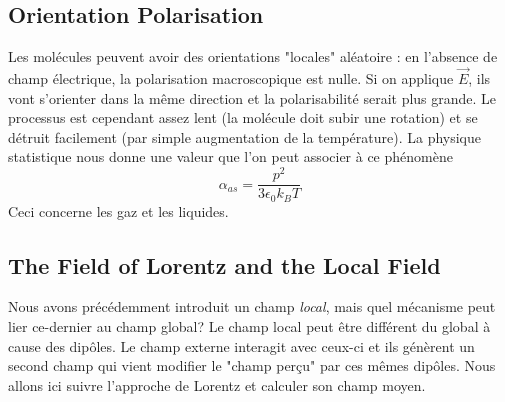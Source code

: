 \subsection{Orientation Polarisation}
Les molécules peuvent avoir des orientations "locales" aléatoire : en l'absence de champ électrique, la 
polarisation macroscopique est nulle. Si on applique $\vec{E}$, ils vont s'orienter dans la même direction
et la polarisabilité serait plus grande. Le processus est cependant assez lent (la molécule doit subir une
rotation) et se détruit facilement (par simple augmentation de la température). La physique statistique nous
donne une valeur que l'on peut associer à ce phénomène
\begin{equation}
\alpha_{as} = \frac{p^2}{3\epsilon_0k_BT}
\end{equation}
Ceci concerne les gaz et les liquides.



\subsection{The Field of Lorentz and the Local Field}
Nous avons précédemment introduit un champ \textit{local}, mais quel mécanisme peut lier ce-dernier au 
champ global? Le champ local peut être différent du global à cause des dipôles. Le champ externe interagit
avec ceux-ci et ils génèrent un second champ qui vient modifier le "champ perçu" par ces mêmes dipôles. Nous
allons ici suivre l'approche de Lorentz et calculer son champ moyen.
\newpage

